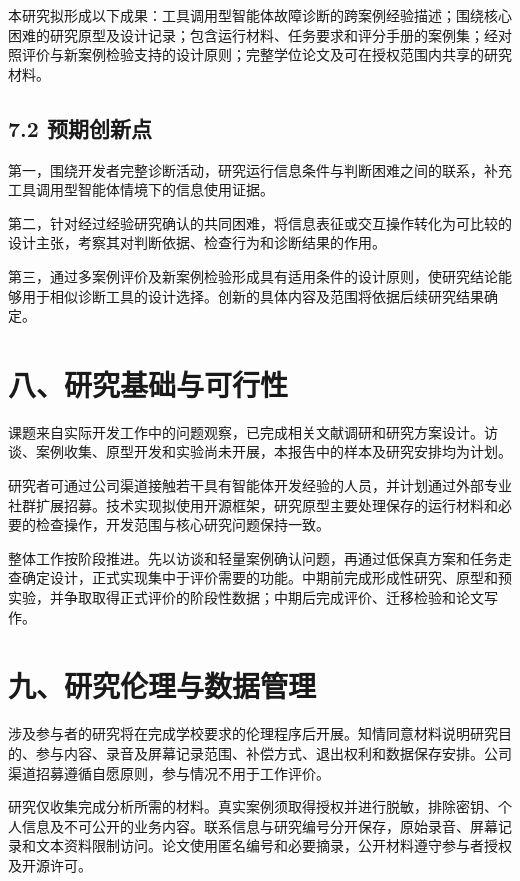 本研究拟形成以下成果：工具调用型智能体故障诊断的跨案例经验描述；围绕核心困难的研究原型及设计记录；包含运行材料、任务要求和评分手册的案例集；经对照评价与新案例检验支持的设计原则；完整学位论文及可在授权范围内共享的研究材料。

\subsection{7.2 预期创新点}

第一，围绕开发者完整诊断活动，研究运行信息条件与判断困难之间的联系，补充工具调用型智能体情境下的信息使用证据。

第二，针对经过经验研究确认的共同困难，将信息表征或交互操作转化为可比较的设计主张，考察其对判断依据、检查行为和诊断结果的作用。

第三，通过多案例评价及新案例检验形成具有适用条件的设计原则，使研究结论能够用于相似诊断工具的设计选择。创新的具体内容及范围将依据后续研究结果确定。

\section{八、研究基础与可行性}

课题来自实际开发工作中的问题观察，已完成相关文献调研和研究方案设计。访谈、案例收集、原型开发和实验尚未开展，本报告中的样本及研究安排均为计划。

研究者可通过公司渠道接触若干具有智能体开发经验的人员，并计划通过外部专业社群扩展招募。技术实现拟使用开源框架，研究原型主要处理保存的运行材料和必要的检查操作，开发范围与核心研究问题保持一致。

整体工作按阶段推进。先以访谈和轻量案例确认问题，再通过低保真方案和任务走查确定设计，正式实现集中于评价需要的功能。中期前完成形成性研究、原型和预实验，并争取取得正式评价的阶段性数据；中期后完成评价、迁移检验和论文写作。

\section{九、研究伦理与数据管理}

涉及参与者的研究将在完成学校要求的伦理程序后开展。知情同意材料说明研究目的、参与内容、录音及屏幕记录范围、补偿方式、退出权利和数据保存安排。公司渠道招募遵循自愿原则，参与情况不用于工作评价。

研究仅收集完成分析所需的材料。真实案例须取得授权并进行脱敏，排除密钥、个人信息及不可公开的业务内容。联系信息与研究编号分开保存，原始录音、屏幕记录和文本资料限制访问。论文使用匿名编号和必要摘录，公开材料遵守参与者授权及开源许可。

